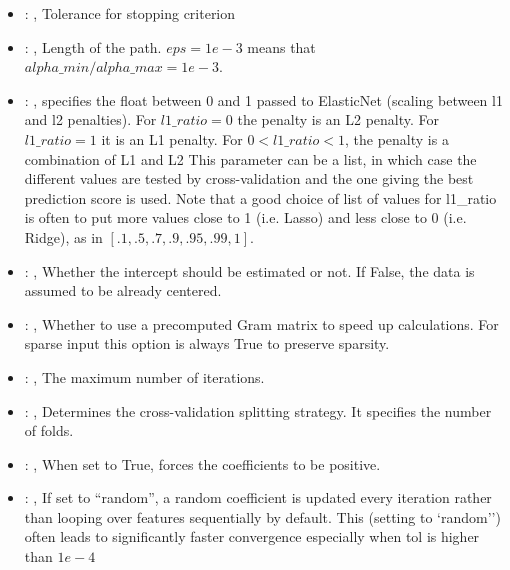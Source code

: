 \begin{itemize}
    \item {}: , 
      Tolerance for stopping criterion

    \item {}: , 
      Length of the path. $eps=1e-3$ means that
      $alpha\_min / alpha\_max = 1e-3$.

    \item {}: , 
      specifies the                                                  float between 0 and 1 passed to
      ElasticNet (scaling between l1 and l2 penalties).
      For $l1\_ratio = 0$ the penalty is an L2 penalty. For $l1\_ratio = 1$ it is
      an L1 penalty. For $0 < l1\_ratio < 1$, the penalty is a combination of L1
      and L2 This parameter can be a list, in which case the different values
      are tested by cross-validation and the one giving the best prediction score
      is used. Note that a good choice of list of values for l1\_ratio is often to
      put more values close to 1 (i.e. Lasso) and less close to 0 (i.e. Ridge),
      as in $[.1, .5, .7, .9, .95, .99, 1]$.

    \item {}: , 
      Whether the intercept should be estimated or not. If False,
      the data is assumed to be already centered.

    \item {}: , 
      Whether to use a precomputed Gram matrix to speed up calculations.
      For sparse input this option is always True to preserve sparsity.

    \item {}: , 
      The maximum number of iterations.

    \item {}: , 
      Determines the cross-validation splitting strategy.
      It specifies the number of folds.

    \item {}: , 
      When set to True, forces the coefficients to be positive.

    \item {}: , 
      If set to ``random'', a random coefficient is updated every iteration
      rather than looping over features sequentially by default. This (setting to `random'')
      often leads to significantly faster convergence especially when tol is higher than $1e-4$


\end{itemize}
